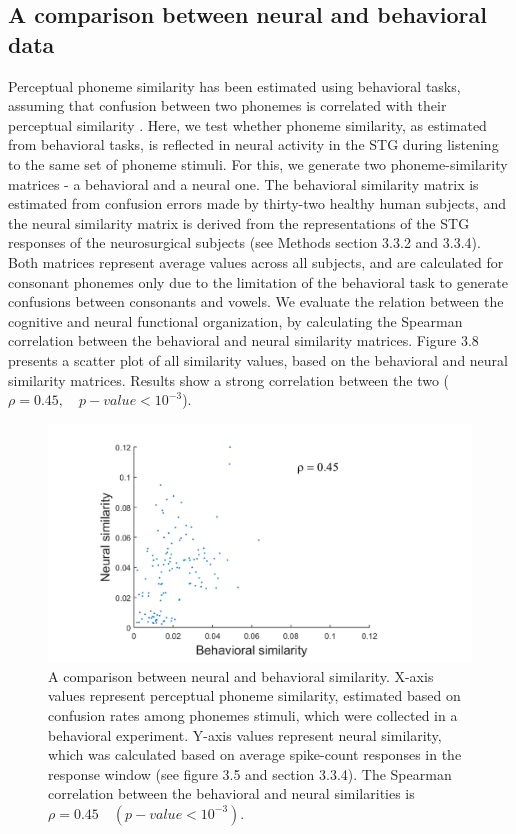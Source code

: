 \subsection{A comparison between neural and behavioral data}
Perceptual phoneme similarity has been estimated using behavioral tasks, assuming that confusion between two phonemes is correlated with their perceptual similarity \citep{NicelyMiller1955, Tversky1977, Shepard1987}. Here, we test whether phoneme similarity, as estimated from behavioral tasks, is reflected in neural activity in the STG during listening to the same set of phoneme stimuli. For this, we generate two phoneme-similarity matrices - a behavioral and a neural one. The behavioral similarity matrix is estimated from confusion errors made by thirty-two healthy human subjects, and the neural similarity matrix is derived from the representations of the STG responses of the neurosurgical subjects (see Methods section 3.3.2 and 3.3.4). Both matrices represent average values across all subjects, and are calculated for consonant phonemes only due to the limitation of the behavioral task to generate confusions between consonants and vowels. We evaluate the relation between the cognitive and neural functional organization, by calculating the Spearman correlation between the behavioral and neural similarity matrices. Figure 3.8 presents a scatter plot of all similarity values, based on the behavioral and neural similarity matrices. Results show a strong correlation between the two ($\rho = 0.45, \quad p-value < 10^{-3}$).

\begin{figure}[H]
\vspace{.3in}
\includegraphics[width=\linewidth]{Figures/Ch3/scatter_behav_neural.png}
\caption{A comparison between neural and behavioral similarity. X-axis values represent perceptual phoneme similarity, estimated based on confusion rates among phonemes stimuli, which were collected in a behavioral experiment. Y-axis values represent neural similarity, which was calculated based on average spike-count responses in the response window (see figure 3.5 and section 3.3.4). The Spearman correlation between the behavioral and neural similarities is $\rho = 0.45 \quad (p-value < 10^{-3})$.}
\end{figure}

